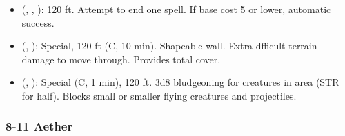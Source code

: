 \begin{itemize}
	\item {} (, , ): 120 ft. Attempt to end one spell. If base cost 5 or lower, automatic success.
	\item {} (, ): Special, 120 ft (C, 10 min). Shapeable wall. Extra dfficult terrain + damage to move through. Provides total cover.
	\item {} (, ): Special (C, 1 min), 120 ft. 3d8 bludgeoning for creatures in area (STR for half). Blocks small or smaller flying creatures and projectiles.
\end{itemize}

\subsubsection{8-11 Aether}

